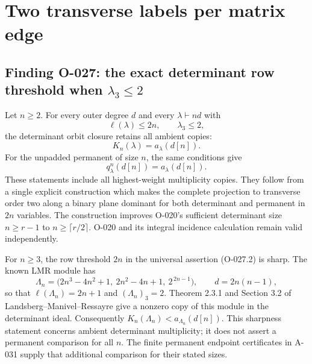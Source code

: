 \section{Two transverse labels per matrix edge}

\subsection*{Finding O-027: the exact determinant row threshold when \(\lambda_3\leq2\)}
Let \(n\geq2\). For every outer degree \(d\) and every
\(\lambda\vdash nd\) with
\[
                    \ell(\lambda)\leq2n,\qquad \lambda_3\leq2,
                                                               \tag{O-027.1}
\]
the determinant orbit closure retains all ambient copies:
\[
                         K_n(\lambda)=a_\lambda(d[n]).
                                                               \tag{O-027.2}
\]
For the unpadded permanent of size \(n\), the same conditions give
\[
                         q^n_\lambda(d[n])=a_\lambda(d[n]).
                                                               \tag{O-027.3}
\]
These statements include all highest-weight multiplicity copies.
They follow from a single explicit construction which makes the complete
projection to transverse order two along a binary plane dominant for
both determinant and permanent in \(2n\) variables.
The construction improves O-020's sufficient determinant size
\(n\geq r-1\) to \(n\geq\lceil r/2\rceil\).
O-020 and its integral incidence calculation remain valid independently.

For \(n\geq3\), the row threshold \(2n\) in the universal assertion
(O-027.2) is sharp. The known LMR module has
\[
 \Lambda_n=\bigl(2n^3-4n^2+1,\ 2n^2-4n+1,\ 2^{\,2n-1}\bigr),
 \qquad d=2n(n-1),
                                                               \tag{O-027.4}
\]
so that \(\ell(\Lambda_n)=2n+1\) and \((\Lambda_n)_3=2\).
Theorem 2.3.1 and Section 3.2 of Landsberg--Manivel--Ressayre
give a nonzero copy of this module in the determinant ideal.
Consequently \(K_n(\Lambda_n)<a_{\Lambda_n}(d[n])\).
This sharpness statement concerns ambient determinant multiplicity;
it does not assert a permanent comparison for all \(n\).
The finite permanent endpoint certificates in A-031 supply that
additional comparison for their stated sizes.

